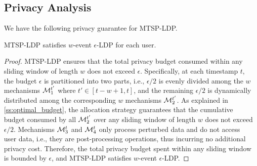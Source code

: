
\subsection{Privacy Analysis}

We have the following privacy guarantee for MTSP-LDP.

\begin{theorem}
  MTSP-LDP satisfies $w$-event $\epsilon$-LDP for each user.
\end{theorem}

\begin{proof}
  MTSP-LDP ensures that the total privacy budget consumed within any sliding
  window of length $w$ does not exceed $\epsilon$.
  Specifically, at each timestamp $t$, the budget $\epsilon$ is partitioned into
  two parts, i.e., $\epsilon/2$ is evenly divided among the $w$ mechanisms
  $\mathcal{M}_1^{t'}$ where $t'\in [t-w+1, t]$, and the remaining $\epsilon/2$ is
  dynamically distributed among the corresponding $w$ mechanisms $\mathcal{M}_2^{t'}$.
  As explained in \cref{ss:optimal_budget}, the allocation strategy guarantees
  that the cumulative budget consumed by all $\mathcal{M}_2^{t'}$ over any sliding
  window of length $w$ does not exceed $\epsilon/2$.
  Mechanisms $\mathcal{M}_3^t$ and $\mathcal{M}_4^t$ only process perturbed data and do not
  access user data, i.e., they are post-processing operations, thus incurring no
  additional privacy cost.
  Therefore, the total privacy budget spent within any sliding window is bounded
  by $\epsilon$, and MTSP-LDP satisfies $w$-event $\epsilon$-LDP.
\end{proof}
